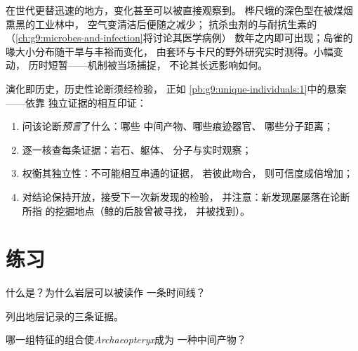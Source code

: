 \begin{example}[观察变化]\label{ex:g9:evidence-of-evolution:live}
在世代更替迅速的地方，变化甚至可以被直接观察到。
桦尺蛾的深色型在被煤烟熏黑的工业林中，
空气变清洁后便随之减少；
抗杀虫剂的与耐抗生素的
（\cref{ch:g9:microbes-and-infection}将讨论其医学病例）
数年之内即可出现；岛雀的
喙大小分布随干旱与丰裕而变化，
由套环与卡尺的野外研究实时测得。小幅变动，
历时短暂——机制被当场捕捉，
不论其长远影响如何。
\end{example}

\begin{method}[权衡历史证据]\label{met:g9:evidence-of-evolution:weigh}
演化即历史，历史性论断须经检验，
正如
\cref{pb:g9:unique-individuals:1}中的悬案——依靠
独立证据的相互印证：
\begin{enumerate}
  \item 问该论断\emph{预言}了什么：哪些
        中间产物、哪些痕迹器官、
        哪些分子距离；
  \item 逐一核查每条证据：岩石、躯体、
        分子与实时观察；
  \item 权衡其独立性：不可能相互串通的证据，
        若彼此吻合，
        则可信度成倍增加；
  \item 对结论保持开放，接受下一次新发现的检验，
        并注意：新发现屡屡落在论断所指
        的挖掘地点（鲸的后肢曾被寻找，
        并被找到）。
\end{enumerate}
\end{method}

\section{练习}

\begin{exercise}[$\star$]\label{exo:g9:evidence-of-evolution:1}
什么是？为什么岩层可以被读作
一条时间线？
\end{exercise}

\begin{exercise}[$\star$]\label{exo:g9:evidence-of-evolution:2}
列出地层记录的三条证据。
\end{exercise}

\begin{exercise}[$\star$]\label{exo:g9:evidence-of-evolution:3}
哪一组特征的组合使\emph{Archaeopteryx}成为
一种中间产物？
\end{exercise}

